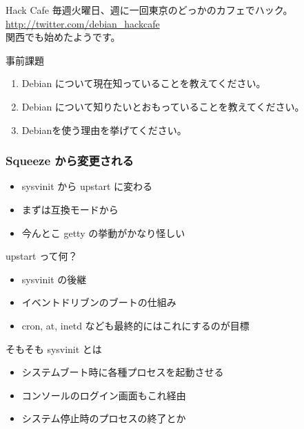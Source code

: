 \begin{frame}{Hack Cafe}
 毎週火曜日、週に一回東京のどっかのカフェでハック。\\
 \url{http://twitter.com/debian_hackcafe}\\
 関西でも始めたようです。
\end{frame}


\begin{frame}{事前課題}
\begin{enumerate}
 \item Debian について現在知っていることを教えてください。
 \item Debian について知りたいとおもっていることを教えてください。
 \item Debianを使う理由を挙げてください。
\end{enumerate}
\end{frame}

{\footnotesize

}





\begin{frame}
 \frametitle{Squeeze から変更される}
 \begin{itemize}
  \item sysvinit から upstart に変わる
  \item まずは互換モードから
  \item 今んとこ getty の挙動がかなり怪しい
 \end{itemize}
\end{frame}


\begin{frame}{upstart って何？}
 \begin{itemize}
  \item sysvinit の後継
  \item イベントドリブンのブートの仕組み
  \item cron, at, inetd なども最終的にはこれにするのが目標
 \end{itemize}
\end{frame}

\begin{frame}{そもそも sysvinit とは}
 \begin{itemize}
  \item システムブート時に各種プロセスを起動させる
  \item コンソールのログイン画面もこれ経由
  \item システム停止時のプロセスの終了とか
 \end{itemize}
\end{frame}

